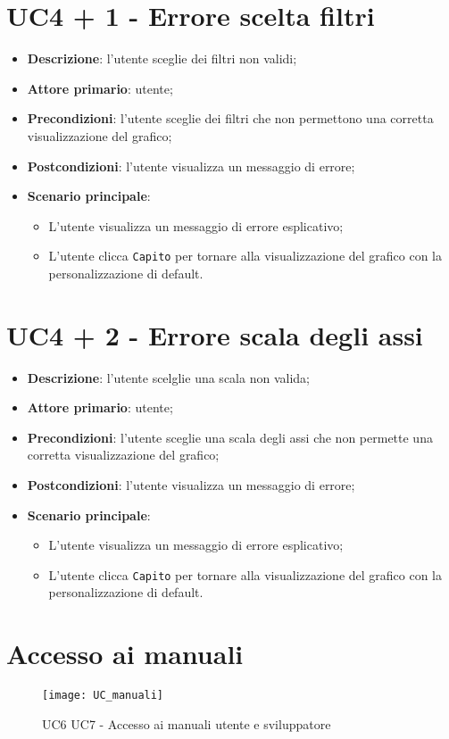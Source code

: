 \section{UC4 + 1 - Errore scelta filtri}
\begin{itemize}
  \item \textbf{Descrizione}: l'utente sceglie dei filtri non validi;
  \item \textbf{Attore primario}: utente;
  \item \textbf{Precondizioni}: l'utente sceglie dei filtri che non permettono una corretta visualizzazione del grafico;
  \item \textbf{Postcondizioni}: l'utente visualizza un messaggio di errore;
  \item \textbf{Scenario principale}:
    \begin{itemize}
      \item L'utente visualizza un messaggio di errore esplicativo;
      \item L'utente clicca \texttt{Capito} per tornare alla visualizzazione del grafico con la personalizzazione di default.
    \end{itemize}
\end{itemize}

\section{UC4 + 2 - Errore scala degli assi}
\begin{itemize}
  \item \textbf{Descrizione}: l'utente scelglie una scala non valida;
  \item \textbf{Attore primario}: utente;
  \item \textbf{Precondizioni}: l'utente sceglie una scala degli assi che non permette una corretta visualizzazione del grafico;
  \item \textbf{Postcondizioni}: l'utente visualizza un messaggio di errore;
  \item \textbf{Scenario principale}:
    \begin{itemize}
      \item L'utente visualizza un messaggio di errore esplicativo;
      \item L'utente clicca \texttt{Capito} per tornare alla visualizzazione del grafico con la personalizzazione di default.
    \end{itemize}
\end{itemize}

\section{Accesso ai manuali}
\begin{figure}[h]
  \centering
  \texttt{[image: UC\_manuali]}
  \caption{UC6 UC7 - Accesso ai manuali utente e sviluppatore}
\end{figure}
